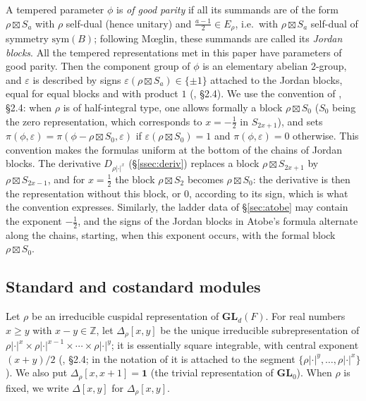 \documentclass[a4paper,12pt,leqno]{amsart}
\theoremstyle{plain}
\theoremstyle{definition}
\begin{document}
A tempered parameter $\phi$ is \emph{of good parity} if all its summands are of the form
$\rho\boxtimes S_a$ with $\rho$ self-dual (hence unitary) and $\frac{a-1}2\in E_\rho$, i.e.\ with
$\rho\boxtimes S_a$ self-dual of symmetry $\mathrm{sym}(B)$; following M\oe glin, these summands are
called its \emph{Jordan blocks}. All the tempered representations met in this paper have parameters of
good parity. Then the component group of $\phi$ is an elementary abelian $2$-group, and $\varepsilon$ is
described by signs $\varepsilon(\rho\boxtimes S_a)\in\{\pm1\}$ attached to the Jordan blocks, equal for
equal blocks and with product $1$ (\cite{Ato24}, \S2.4). We use the convention of \cite{Ato24}, \S2.4:
when $\rho$ is of half-integral type, one allows formally a block $\rho\boxtimes S_0$ ($S_0$ being the
zero representation, which corresponds to $x=-\frac12$ in $S_{2x+1}$), and sets
$\pi(\phi,\varepsilon)=\pi(\phi-\rho\boxtimes S_0,\varepsilon)$ if $\varepsilon(\rho\boxtimes S_0)=1$ and
$\pi(\phi,\varepsilon)=0$ otherwise. This convention makes the formulas uniform at the bottom of the
chains of Jordan blocks. The derivative $D_{\rho|\cdot|^x}$ (\S\ref{ssec:deriv}) replaces a block
$\rho\boxtimes S_{2x+1}$ by $\rho\boxtimes S_{2x-1}$, and for $x=\frac12$ the block $\rho\boxtimes S_2$
becomes $\rho\boxtimes S_0$: the derivative is then the representation without this block, or $0$,
according to its sign, which is what the convention expresses. Similarly, the ladder data of
\S\ref{sec:atobe} may contain the exponent $-\frac12$, and the signs of the Jordan blocks in Atobe's
formula alternate along the chains, starting, when this exponent occurs, with the formal block
$\rho\boxtimes S_0$.

\subsection{Standard and costandard modules}\label{ssec:std}
Let $\rho$ be an irreducible cuspidal representation of $\mathbf{GL}_d(F)$. For real numbers $x\geq y$
with $x-y\in\mathbb{Z}$, let $\Delta_\rho[x,y]$ be the unique irreducible subrepresentation of
$\rho|\cdot|^x\times\rho|\cdot|^{x-1}\times\cdots\times\rho|\cdot|^y$; it is essentially square
integrable, with central exponent $(x+y)/2$ (\cite{Ato24}, \S2.4; in the notation of \cite{Zel80} it is
attached to the segment $\{\rho|\cdot|^y,\ldots,\rho|\cdot|^x\}$). We also put $\Delta_\rho[x,x+1]=\mathbf{1}$
(the trivial representation of $\mathbf{GL}_0$). When $\rho$ is fixed, we write $\Delta[x,y]$ for $\Delta_\rho[x,y]$.
\end{document}
